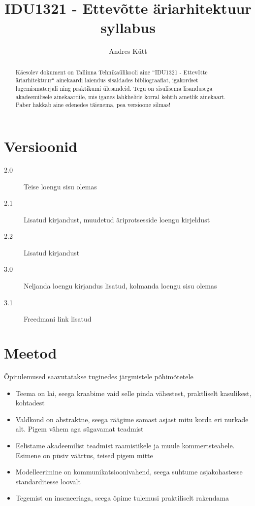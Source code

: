 \documentclass[nobib]{tufte-handout}
\title{IDU1321 - Ettevõtte äriarhitektuur syllabus}
\author[Andres Kütt]{Andres Kütt}
\begin{document}
\maketitle
\begin{abstract}
\noindent
Käesolev dokument on Tallinna Tehnikaülikooli aine ``IDU1321 - Ettevõtte äriarhitektuur`` ainekaardi laiendus sisaldades bibliograafiat, igakordset lugemismaterjali ning praktikumi ülesandeid. Tegu on sisulisema lisandusega akadeemilisele ainekaardile, mis iganes lahkhelide korral kehtib ametlik ainekaart. Paber hakkab aine edenedes täienema, pea versioone silmas!
\end{abstract}

\section{Versioonid}
\begin{description}
	\item[2.0] Teise loengu sisu olemas
	\item[2.1] Lisatud kirjandust, muudetud äriprotsesside loengu kirjeldust
	\item[2.2] Lisatud kirjandust
	\item[3.0] Neljanda loengu kirjandus lisatud, kolmanda loengu sisu olemas
	\item[3.1] Freedmani link lisatud
\end{description}

\section{Meetod}
Õpitulemused saavutatakse tuginedes järgmistele põhimõtetele
\begin{itemize}
	\item Teema on lai, seega kraabime vaid selle pinda vähestest, praktliselt kasulikest, kohtadest
	\item Valdkond on abstraktne, seega räägime samast asjast mitu korda eri nurkade alt. Pigem vähem aga sügavamat teadmist
	\item Eelistame akadeemilist teadmist raamistikele ja muule kommertsteabele. Esimene on püsiv väärtus, teised pigem mitte
	\item Modelleerimine on kommunikatsioonivahend, seega suhtume asjakohastesse standarditesse loovalt
	\item Tegemist on inseneeriaga, seega õpime tulemusi praktiliselt rakendama
\end{itemize}
\end{document}
